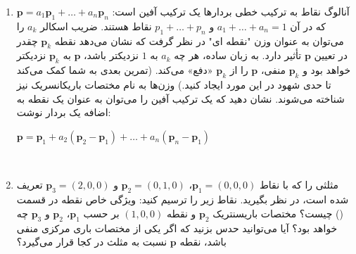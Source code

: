 {\begin{spacing}{1.5}
\begin{enumerate}[label=\textbf{\arabic*}.]
            \item {
                آنالوگ نقاط به ترکیب خطی بردارها یک ترکیب آفین است:
                $\textbf{p}=a_{1}\textbf{p}_{1}+\dots+a_{n}\textbf{p}_{n}$ که در آن $a_{1}+\dots+a_{n}=1$ و $p_{1}+\dots+p_{n}$ نقاط هستند.
                ضریب اسکالر $a_{k}$ را می‌توان به عنوان وزن "نقطه ای" در نظر گرفت
                که نشان می‌دهد نقطه $\textbf{p}_{k}$ چقدر در تعیین $\textbf{p}$ تأثیر دارد.
                به زبان ساده، هر چه $a_{k}$ به $1$ نزدیکتر باشد،
                $\textbf{p}$ به $\textbf{p}_{k}$ نزدیکتر خواهد بود و $\textbf{p}_{k}$ منفی، $\textbf{p}$ را از $\textbf{p}_{k}$ «دفع» می‌کند.
                (تمرین بعدی به شما کمک می‌کند تا حدی شهود در این مورد ایجاد کنید.) وزن‌ها به نام مختصات باریکانسریک نیز شناخته می‌شوند.
                نشان دهید که یک ترکیب آفین را می‌توان به عنوان یک نقطه به اضافه یک بردار نوشت:
                \begin{center}
                    $\textbf{p}=\textbf{p}_{1}+a_{2}(\textbf{p}_{2}-\textbf{p}_{1})+\dots+a_{n}(\textbf{p}_{n}-\textbf{p}_{1})$
                \end{center}
            } \\\textbf{\vspace{6pt}}

            \item {
                مثلثی را که با نقاط $\textbf{p}_{1}=(0,0,0)$، $\textbf{p}_{2}=(0,1,0)$ و $\textbf{p}_{3}=(2,0,0)$ تعریف شده است، در نظر بگیرید. نقاط زیر را ترسیم کنید:
                 \textbf{\vspace{-6pt}}
                ویژگی خاص نقطه در قسمت () چیست؟ مختصات باریسنتریک $\textbf{p}_{2}$ و نقطه $(1,0,0)$ بر حسب $\textbf{p}_{1}$، $\textbf{p}_{2}$ و $\textbf{p}_{3}$ چه خواهد بود؟ آیا می‌توانید حدس بزنید که اگر یکی از مختصات باری مرکزی منفی باشد، نقطه $\textbf{p}$ نسبت به مثلث در کجا قرار می‌گیرد؟
            } \\\textbf{\vspace{6pt}}


\end{enumerate}
\end{spacing}}
